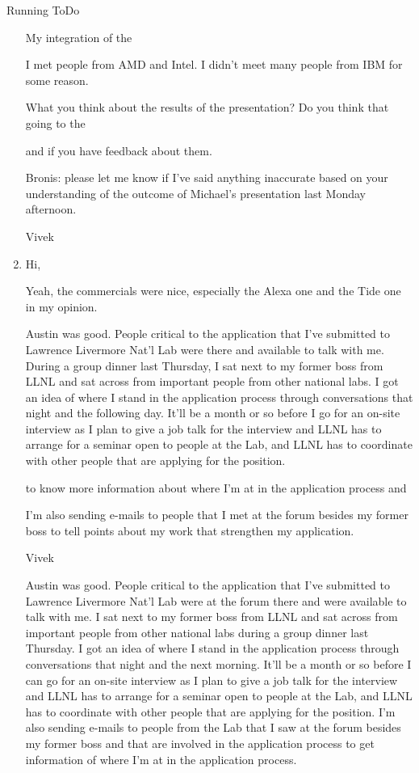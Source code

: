 \begin{columns}
\begin{column}{0.6\linewidth}
\begin{block}{Running ToDo}
\begin{enumerate}
My integration of the 

I met people from AMD and Intel. I didn't meet many people from IBM
for some reason. 

What you think about the results of the presentation? Do you think
that going to the 

 and if you have feedback
about them. 

Bronis: please let me know if I've said anything inaccurate based on
your understanding of the outcome of Michael's presentation last
Monday afternoon.

Vivek

\tiny \item \tiny 
Hi, 

Yeah, the commercials were nice, especially the Alexa one and the Tide one
in my opinion.

Austin was good. People critical to
the application that I've submitted to Lawrence Livermore
Nat'l Lab were there and available to talk with me. 
During a group dinner last Thursday, I sat next to my former boss from LLNL and sat across from
important people from other national labs. I got an idea of where I stand in the application
process through conversations that night and the following day. 
It'll be a month or so before I go for an
on-site interview as I plan to give a job talk for the interview and
LLNL has to arrange for a seminar open to people at the Lab, 
and LLNL has to coordinate with other people that are applying for the
position. 


to know more information about where I'm at in the application
process and 

I'm also sending e-mails to people that I met at the forum besides my
former boss to tell points about my work that strengthen my
application. 

Vivek


Austin was good. People critical to the application that I've
submitted to Lawrence Livermore Nat'l Lab were at the forum there and
were available to talk with me. I sat next to my former boss from LLNL
and sat across from important people from other national labs during a
group dinner last Thursday. I got an idea of where I stand in the
application process through conversations that night and the next
morning. It'll be a month or so before I can go for an on-site
interview as I plan to give a job talk for the interview and LLNL has
to arrange for a seminar open to people at the Lab, and LLNL has to
coordinate with other people that are applying for the position. I'm
also sending e-mails to people from the Lab that I saw at the forum
besides my former boss and that are involved in the application
process to get information of where I’m at in the application process.


\end{enumerate}
\end{block}
\end{column}
\end{columns}
